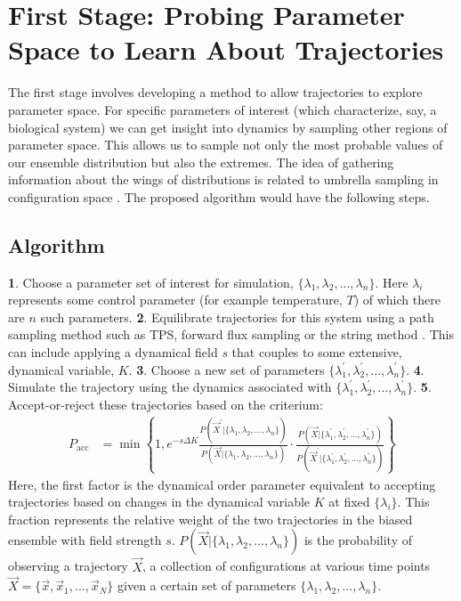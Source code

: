 \documentclass[11pt]{article}
\begin{document}
\section*{First Stage: Probing Parameter Space to Learn About Trajectories}

The first stage involves developing a method to allow trajectories to explore parameter space. For specific parameters of interest (which characterize, say, a biological system) we can get insight into dynamics by sampling other regions of parameter space.  This allows us to sample not only the most probable values of our ensemble distribution but also the extremes.  The idea of gathering information about the wings of distributions is related to umbrella sampling in configuration space \cite{IMSM}.  The proposed algorithm would have the following steps.
\subsection*{Algorithm}
\textbf{1}. Choose a parameter set of interest for simulation, $\{\lambda_{1}, \lambda_{2},...,\lambda_{n}\}$.  Here $\lambda_{i}$ represents some control parameter (for example temperature, $T$) of which there are $n$ such parameters.
\textbf{2}. Equilibrate trajectories for this system using a path sampling method such as TPS, forward flux sampling \cite{Allen2009} or the string method \cite{E2002}. This can include applying a dynamical field $s$ that couples to some extensive, dynamical variable, $K$.
\textbf{3}. Choose a new set of parameters $\{\lambda_{1}^{\prime}, \lambda_{2}^{\prime},...,\lambda_{n}^{\prime}\}$.
\textbf{4}. Simulate the trajectory using the dynamics associated with $\{\lambda_{1}^{\prime}, \lambda_{2}^{\prime},...,\lambda_{n}^{\prime}\}$.
\textbf{5}. Accept-or-reject these trajectories based on the criterium:
\begin{align*}
P_{\mathrm{acc}}&=\min\left \{1,e^{-s \Delta K} \frac{P(\vec{X}^{\prime}|\{\lambda_{1}, \lambda_{2},...,\lambda_{n}\})}{P(\vec{X}|\{\lambda_{1}, \lambda_{2},...,\lambda_{n}\})} \cdot  \frac{P(\vec{X}|\{\lambda_{1}^{\prime}, \lambda_{2}^{\prime},...,\lambda_{n}^{\prime}\})}{P(\vec{X}^{\prime}|\{\lambda_{1}^{\prime}, \lambda_{2}^{\prime},...,\lambda_{n}^{\prime}\})} \right \}
\end{align*}
Here, the first factor is the dynamical order parameter equivalent to accepting trajectories based on changes in the dynamical variable $K$ at fixed $\{\lambda_i\}$. This fraction represents the relative weight of the two trajectories in the biased ensemble with field strength $s$.   $P(\vec{X}|\{\lambda_{1}, \lambda_{2},...,\lambda_{n}\})$ is the probability of observing a trajectory $\vec{X}$, a collection  of configurations at various time points $\vec{X}=\{\vec{x},\vec{x}_{1},...,\vec{x}_{N}\}$ given a certain set of parameters $\{\lambda_{1}, \lambda_{2},...,\lambda_{n}\}$. %
\end{document}
